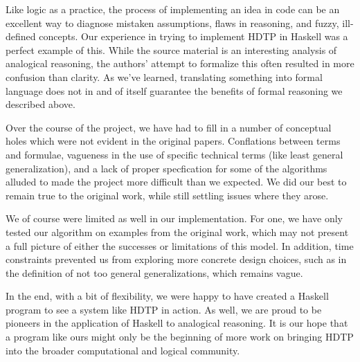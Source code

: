 \documentclass[12pt,a4paper]{article}
\begin{document}
Like logic as a practice, the process of implementing an idea in code can be an excellent way to diagnose mistaken assumptions, flaws in reasoning, and fuzzy, ill-defined concepts. Our experience in trying to implement HDTP in Haskell was a perfect example of this. While the source material is an interesting analysis of analogical reasoning, the authors' attempt to formalize this often resulted in more confusion than clarity. As we've learned, translating something into formal language does not in and of itself guarantee the benefits of formal reasoning we described above.

Over the course of the project, we have had to fill in a number of conceptual holes which were not evident in the original papers. Conflations between terms and formulae, vagueness in the use of specific technical terms (like least general generalization), and a lack of proper specfication for some of the algorithms alluded to made the project more difficult than we expected. We did our best to remain true to the original work, while still settling issues where they arose.

We of course were limited as well in our implementation. For one, we have only tested our algorithm on examples from the original work, which may not present a full picture of either the successes or limitations of this model. In addition, time constraints prevented us from exploring more concrete design choices, such as in the definition of not too general generalizations, which remains vague.

In the end, with a bit of flexibility, we were happy to have created a Haskell program to see a system like HDTP in action. As well, we are proud to be pioneers in the application of Haskell to analogical reasoning. It is our hope that a program like ours might only be the beginning of more work on bringing HDTP into the broader computational and logical community.


% 





\end{document}
